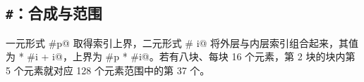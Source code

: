 \subsection*{\texttt{\#}：合成与范围}

一元形式 \co@#p@ 取得索引上界，二元形式 \co@p # i@ 将外层与内层索引组合起来，其值为 \co@p * #i + i@，上界为 \co@#p * #i@。若有八块、每块 16 个元素，第 2 块的块内第 5 个元素就对应 128 个元素范围中的第 37 个。
